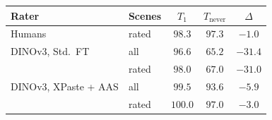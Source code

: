 \begin{tabular}{@{}llccc@{}}
\toprule
Rater & Scenes & $T_1$ & $T_{\text{never}}$ & $\Delta$ \\
\midrule
Humans & rated & $98.3$ & $97.3$ & $-1.0$ \\
\midrule
DINOv3, Std.\ FT & all & $96.6$ & $65.2$ & $-31.4$ \\
 & rated & $98.0$ & $67.0$ & $-31.0$ \\
\midrule
DINOv3, XPaste + AAS & all & $99.5$ & $93.6$ & $-5.9$ \\
 & rated & $100.0$ & $97.0$ & $-3.0$ \\
\bottomrule
\end{tabular}
